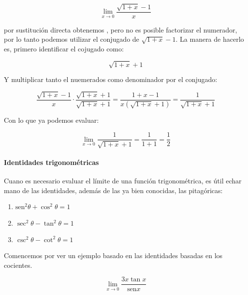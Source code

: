 \documentclass[
]{book}
\providecommand{\tightlist}{%
  \setlength{\itemsep}{0pt}\setlength{\parskip}{0pt}}
\begin{document}
\begin{equation}
\lim \limits_{x \rightarrow 0} \frac{\sqrt{1 + x}-1}{x}
\end{equation}

por sustitución directa obtenemos , pero no es posible factorizar el numerador, por lo tanto podemos utilizar el conjugado de \(\sqrt{1 + x} - 1\). La manera de hacerlo es, primero identificar el cojugado como:

\begin{equation}
    \sqrt{1 + x} + 1
\end{equation}

Y multiplicar tanto el nuemerados como denominador por el conjugado:

\begin{equation}
  \frac{\sqrt{1 + x}-1}{x} \cdot  \frac{\sqrt{1 + x} + 1}{\sqrt{1 + x} + 1} = \frac{1 + x-1}{x(\sqrt{1 + x} + 1)} = \frac{1}{\sqrt{1 + x} + 1}
\end{equation}

Con lo que ya podemos evaluar:

\begin{equation}
\lim\limits_{x \rightarrow 0} \frac{1}{\sqrt{1 + x} + 1} = \frac{1}{1 + 1} = \frac{1}{2}
\end{equation}

\hypertarget{identidades-trigonomuxe9tricas}{%
\paragraph{Identidades trigonométricas}\label{identidades-trigonomuxe9tricas}}

Cuano es necesario evaluar el límite de una función trigonométrica, es útil echar mano de las identidades, además de las ya bien conocidas, las pitagóricas:

\begin{enumerate}
\def\labelenumi{\arabic{enumi}.}
\tightlist
\item
  \(\mathrm{sen}^2 \theta + \cos^2 \theta = 1\)
\item
  \(\sec^2 \theta - \tan^2 \theta = 1\)
\item
  \(\csc^2 \theta - \cot^2 \theta = 1\)
\end{enumerate}

Comencemos por ver un ejemplo basado en las identidades basadas en los cocientes.

\begin{equation}
\lim \limits_{x \rightarrow 0} \frac{3x \tan x}{\mathrm{sen}x}
\end{equation}
\end{document}
